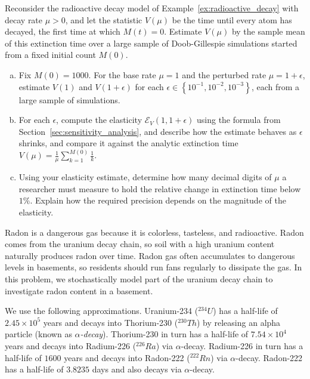 \begin{exercises}
\item \label{ex:hw_radioactive_decay_elasticity}
Reconsider the radioactive decay model of Example~\ref{ex:radioactive_decay} with decay rate $\mu > 0$, and let the statistic $V(\mu)$ be the time until every atom has decayed, the first time at which $M(t) = 0$. Estimate $V(\mu)$ by the sample mean of this extinction time over a large sample of Doob-Gillespie simulations started from a fixed initial count $M(0)$.
\begin{enumerate}[(a)]
\item Fix $M(0) = 1000$. For the base rate $\mu = 1$ and the perturbed rate $\mu = 1 + \epsilon$, estimate $V(1)$ and $V(1+\epsilon)$ for each $\epsilon \in \left\{10^{-1}, 10^{-2}, 10^{-3}\right\}$, each from a large sample of simulations.
\item For each $\epsilon$, compute the elasticity $\mathcal{E}_V(1, 1+\epsilon)$ using the formula from Section~\ref{sec:sensitivity_analysis}, and describe how the estimate behaves as $\epsilon$ shrinks, and compare it against the analytic extinction time $V(\mu) = \frac{1}{\mu}\sum_{k=1}^{M(0)} \frac{1}{k}$.
\item Using your elasticity estimate, determine how many decimal digits of $\mu$ a researcher must measure to hold the relative change in extinction time below $1\%$. Explain how the required precision depends on the magnitude of the elasticity.
\end{enumerate}


\item \label{ex:hw_uranium_decay}
Radon is a dangerous gas because it is colorless, tasteless, and radioactive. Radon comes from the uranium decay chain, so soil with a high uranium content naturally produces radon over time. Radon gas often accumulates to dangerous levels in basements, so residents should run fans regularly to dissipate the gas. In this problem, we stochastically model part of the uranium decay chain to investigate radon content in a basement.

We use the following approximations. Uranium-234 (${}^{234}U$) has a half-life of $2.45\times10^5$ years and decays into Thorium-230 (${}^{230}Th$) by releasing an alpha particle (known as \textit{$\alpha$-decay}). Thorium-230 in turn has a half-life of $7.54\times 10^4$ years and decays into Radium-226 (${}^{226}Ra$) via $\alpha$-decay. Radium-226 in turn has a half-life of $1600$ years and decays into Radon-222 (${}^{222}Rn$) via $\alpha$-decay. Radon-222 has a half-life of $3.8235$ days and also decays via $\alpha$-decay.


\end{exercises}
